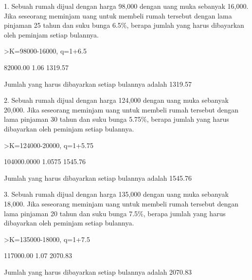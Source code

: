 \documentclass{article}
\begin{document}
\begin{eulernotebook}
\begin{eulercomment}
\end{eulercomment}
\begin{eulercomment}
1. Sebuah rumah dijual dengan harga \textdollar{}98,000 dengan uang muka sebanyak
\textdollar{}16,000. Jika seseorang meminjam uang untuk membeli rumah tersebut
dengan lama pinjaman 25 tahun dan suku bunga 6.5\%, berapa jumlah yang
harus dibayarkan oleh peminjam setiap bulannya. 
\end{eulercomment}
\begin{eulerprompt}
>K=98000-16000, q=1+6.5%
\end{eulerprompt}
\begin{euleroutput}
     82000.00 
         1.06 
      1319.57 
\end{euleroutput}
\begin{eulercomment}
Jumlah yang harus dibayarkan setiap bulannya adalah \textdollar{}1319.57

2. Sebuah rumah dijual dengan harga \textdollar{}124,000 dengan uang muka sebanyak
\textdollar{}20,000. Jika seseorang meminjam uang untuk membeli rumah tersebut
dengan lama pinjaman 30 tahun dan suku bunga 5.75\%, berapa jumlah yang
harus dibayarkan oleh peminjam setiap bulannya.
\end{eulercomment}
\begin{eulerprompt}
>K=124000-20000, q=1+5.75%
\end{eulerprompt}
\begin{euleroutput}
  104000.0000 
       1.0575 
      1545.76 
\end{euleroutput}
\begin{eulercomment}
Jumlah yang harus dibayarkan setiap bulannya adalah \textdollar{}1545.76

3. Sebuah rumah dijual dengan harga \textdollar{}135,000 dengan uang muka sebanyak
\textdollar{}18,000. Jika seseorang meminjam uang untuk membeli rumah tersebut
dengan lama pinjaman 20 tahun dan suku bunga 7.5\%, berapa jumlah yang
harus dibayarkan oleh peminjam setiap bulannya.
\end{eulercomment}
\begin{eulerprompt}
>K=135000-18000, q=1+7.5%
\end{eulerprompt}
\begin{euleroutput}
    117000.00 
         1.07 
      2070.83 
\end{euleroutput}
\begin{eulercomment}
Jumlah yang harus dibayarkan setiap bulannya adalah \textdollar{}2070.83


\end{eulercomment}
\end{eulernotebook}
\end{document}

